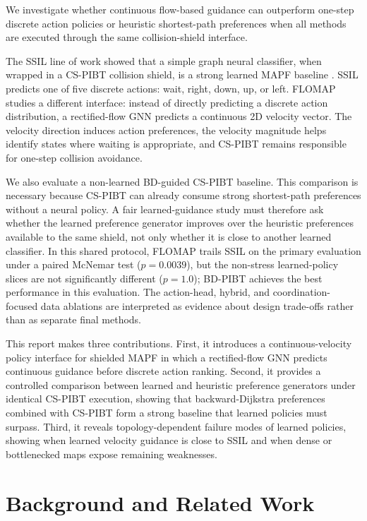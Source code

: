 \documentclass[conference]{IEEEtran}
\begin{document}
We investigate whether continuous flow-based guidance can outperform one-step
discrete action policies or heuristic shortest-path preferences when all
methods are executed through the same collision-shield interface.

The SSIL line of work showed that a simple graph neural classifier, when wrapped
in a CS-PIBT collision shield, is a strong learned MAPF baseline
\cite{veerapaneni2025wsnh}.  SSIL predicts one of five discrete
actions: wait, right, down, up, or left.  FLOMAP studies a different
interface: instead of directly predicting a discrete action distribution, a
rectified-flow GNN predicts a continuous 2D velocity vector.  The
velocity direction induces action preferences, the velocity magnitude helps
identify states where waiting is appropriate, and CS-PIBT remains responsible
for one-step collision avoidance.

We also evaluate a non-learned BD-guided CS-PIBT baseline.
This comparison is necessary because CS-PIBT can already consume strong
shortest-path preferences without a neural policy.  A fair learned-guidance
study must therefore ask whether the learned preference generator improves over
the heuristic preferences available to the same shield, not only whether it is
close to another learned classifier.  In this shared protocol, FLOMAP trails
SSIL on the primary evaluation under a paired McNemar test ($p=0.0039$), but
the non-stress learned-policy slices are not significantly different
($p=1.0$); BD-PIBT achieves the best performance in this evaluation.  The
action-head, hybrid, and
coordination-focused data
ablations are interpreted as evidence about design trade-offs rather than as
separate final methods.

This report makes three contributions.  First, it introduces a continuous-velocity
policy interface for shielded MAPF in which a rectified-flow GNN predicts
continuous guidance before discrete action ranking.  Second, it provides a
controlled comparison between learned and heuristic preference generators under
identical CS-PIBT execution, showing that backward-Dijkstra preferences combined
with CS-PIBT form a strong baseline that learned policies must surpass.  Third,
it reveals topology-dependent failure modes of learned
policies, showing when learned velocity guidance is close to SSIL and when dense or
bottlenecked maps expose remaining weaknesses.

\section{Background and Related Work}
\end{document}

